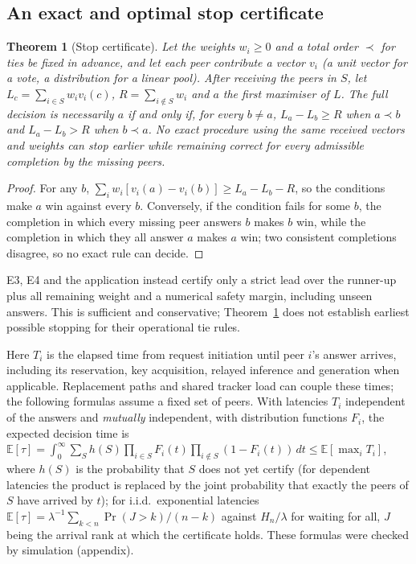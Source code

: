 \documentclass[11pt]{article}
\newtheorem{theorem}{Theorem}
\theoremstyle{definition}
\theoremstyle{remark}
\begin{document}
\subsection{An exact and optimal stop certificate}
\begin{theorem}[Stop certificate]\label{thm:cert}
Let the weights $w_i\ge0$ and a total order $\prec$ for ties be fixed in advance, and let each peer
contribute a vector $v_i$ (a unit vector for a vote, a distribution for a linear pool). After receiving the
peers in $S$, let $L_c=\sum_{i\in S}w_iv_i(c)$, $R=\sum_{i\notin S}w_i$ and $a$ the first maximiser of
$L$. The full decision is necessarily $a$ if and only if, for every $b\neq a$, $L_a-L_b\ge R$ when $a\prec
b$ and $L_a-L_b>R$ when $b\prec a$. No exact procedure using the same received vectors and weights can stop earlier
while remaining correct for every admissible completion by the missing peers.
\end{theorem}
\begin{proof}
For any $b$, $\sum_i w_i[v_i(a)-v_i(b)]\ge L_a-L_b-R$, so the conditions make $a$ win against every $b$.
Conversely, if the condition fails for some $b$, the completion in which every missing peer answers $b$
makes $b$ win, while the completion in which they all answer $a$ makes $a$ win; two consistent completions
disagree, so no exact rule can decide.
\end{proof}
E3, E4 and the application instead certify only a strict lead over the runner-up plus all remaining
weight and a numerical safety margin, including unseen answers. This is sufficient and conservative;
Theorem~\ref{thm:cert} does not establish earliest possible stopping for their operational tie rules.

Here $T_i$ is the elapsed time from request initiation until peer $i$'s answer arrives, including its
reservation, key acquisition, relayed inference and generation when applicable. Replacement paths and
shared tracker load can couple these times; the following formulas assume a fixed set of peers.
With latencies $T_i$ independent of the answers and \emph{mutually} independent, with distribution
functions $F_i$, the expected decision time is
$\mathbb E[\tau]=\int_0^\infty\sum_{S}h(S)\prod_{i\in S}F_i(t)\prod_{i\notin S}(1-F_i(t))\,dt\le\mathbb
E[\max_iT_i]$, where $h(S)$ is the probability that $S$ does not yet certify (for dependent latencies the
product is replaced by the joint probability that exactly the peers of $S$ have arrived by $t$); for i.i.d.\ exponential
latencies $\mathbb E[\tau]=\lambda^{-1}\sum_{k<n}\Pr(J>k)/(n-k)$ against $H_n/\lambda$ for waiting for all,
$J$ being the arrival rank at which the certificate holds. These formulas were checked by simulation
(appendix).
\end{document}
